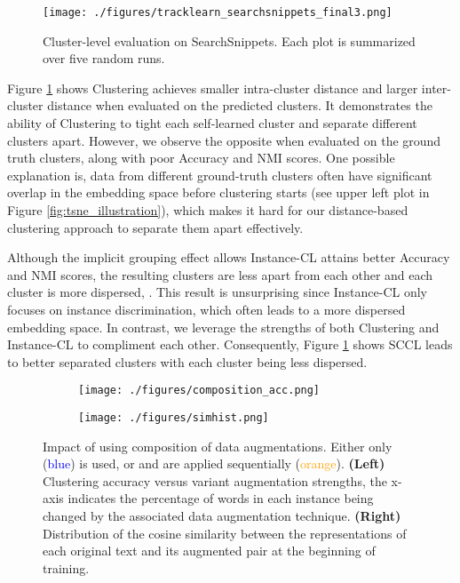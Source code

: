 \documentclass[11pt]{article}
\newcommand{\modify}[1]{{\color{black}{#1}}}
\begin{document}
\begin{figure}[htbp]
    \centering
        \texttt{[image: ./figures/tracklearn\_searchsnippets\_final3.png]}
    \caption{Cluster-level evaluation on SearchSnippets. Each plot is summarized over five random runs.}
        \label{fig:learn_stats}
\end{figure}

Figure \ref{fig:learn_stats} shows  
Clustering achieves smaller intra-cluster distance and larger inter-cluster distance when evaluated on the predicted clusters. It demonstrates the ability of Clustering to tight each self-learned cluster and separate different clusters apart. However, we observe the opposite when evaluated on the ground truth clusters,  along with poor Accuracy and NMI scores. One possible explanation is, data from different ground-truth clusters often have significant overlap in the embedding space before clustering starts (see upper left plot in Figure \ref{fig:tsne_illustration}), which makes it hard for our distance-based clustering approach to separate them apart effectively.

Although the implicit grouping effect allows Instance-CL attains better Accuracy and NMI scores, the resulting clusters are less apart from each other and each cluster is more dispersed, \modify{as indicated by the smaller inter-cluster distance and larger intra-cluster distance}. This result is unsurprising since Instance-CL only focuses on instance discrimination, which often leads to a more dispersed embedding space. 
In contrast, we leverage the strengths of both Clustering and Instance-CL to compliment each other. Consequently, 
Figure \ref{fig:learn_stats} shows SCCL leads to better separated clusters with each cluster being less dispersed.  


\begin{figure*}[htbp]
    \centering
    \begin{subfigure}{0.49\textwidth}
        \centering
        \texttt{[image: ./figures/composition\_acc.png]}
\end{subfigure}
    \begin{subfigure}{0.49\textwidth}
        \centering
         \texttt{[image: ./figures/simhist.png]}
\end{subfigure}
    \caption{Impact of using composition of data augmentations. Either only  (\textcolor{blue}{blue}) is used, or  and  are applied  sequentially (\textcolor{orange}{orange}).  \textbf{(Left)} Clustering accuracy versus variant augmentation strengths, the x-axis indicates the percentage of words in each instance being changed by the associated data augmentation technique. \textbf{(Right)} Distribution of the cosine similarity between the representations of each original text and its augmented pair at the beginning of training.}
    \label{fig:composition_of_augmentation}
\end{figure*}
\end{document}
